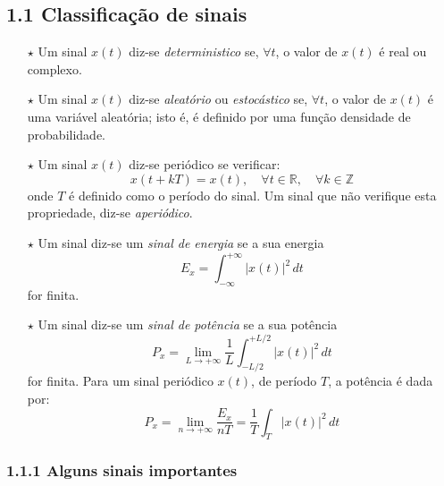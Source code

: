 \subsection{1.1 Classificação de sinais}
\label{subsec:signal-classification}

\begin{mdframed}
    \begin{enumerate}[leftmargin=2em]
        \item[$\pmb{\star}$] Um sinal $x(t)$ diz-se \textit{deterministico} se, $\forall t$, o valor de $x(t)$ é real ou complexo.
        \item[$\pmb{\star}$] Um sinal $x(t)$ diz-se \textit{aleatório} ou \textit{estocástico} se, $\forall t$, o valor de $x(t)$ é uma variável aleatória; isto é, é definido por uma função densidade de probabilidade.
        \item[$\pmb{\star}$] Um sinal $x(t)$ diz-se periódico se verificar:
        $$
            x(t+kT) = x(t),\quad \forall t \in \mathbb{R},\quad \forall k \in \mathbb{Z}
        $$
        onde $T$ é definido como o período do sinal. Um sinal que não verifique esta propriedade, diz-se \textit{aperiódico}.
        \item[$\pmb{\star}$] Um sinal diz-se um \textit{sinal de energia} se a sua energia
        $$
            E_x = \int_{-\infty}^{+\infty} \left| x(t) \right|^2\, dt
        $$
        for finita.
        \item[$\pmb{\star}$] Um sinal diz-se um \textit{sinal de potência} se a sua potência
        $$
            P_x = \lim_{L \to +\infty} \frac{1}{L} \int_{-L/2}^{+L/2} \left| x(t) \right|^2\, dt
        $$
        for finita. Para um sinal periódico $x(t)$, de período $T$, a potência é dada por:
        $$
            P_x = \lim_{n\to +\infty} \frac{E_x}{nT} = \frac{1}{T} \int_{T} \left| x(t) \right|^2\, dt
        $$
    \end{enumerate}
\end{mdframed}

\subsubsection{1.1.1 Alguns sinais importantes}
\label{subsubsec:some-important-signals}

